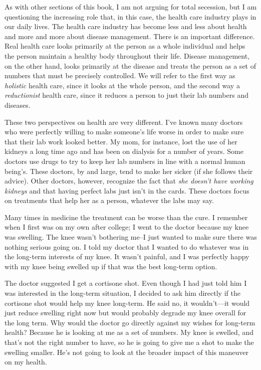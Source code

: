 As with other sections
of this book, I am not arguing for total
secession, but 
I am questioning the
increasing role that,
in this case, the health care industry plays in our daily lives. The
health care industry has become less and less about health and more and
more about disease management. There is an important difference. Real
health care looks primarily at the person as a whole individual and
helps the person maintain a healthy body throughout their life. Disease
management, on the other hand, looks primarily at the disease and
treats the person as a set of numbers that must be precisely
controlled. We will refer to the first way as \textit{holistic} health
care, since it looks at the whole person, and the second way a
\textit{reductionist} health care, since it reduces a person to just
their lab numbers and diseases.

These two perspectives on health are very different.
I've known many doctors who were perfectly willing to
make someone's life worse in order to make sure that
their lab work looked better. My mom, for instance, lost the use of her
kidneys a long time ago and has been on dialysis for a number of years.
Some doctors use drugs to try to keep her lab numbers in line with a
normal human being’s. These doctors, by and large, tend to make her
sicker (if she follows their advice). Other doctors, however, recognize
the fact that \textit{she doesn't have working
kidneys} and that having perfect labs just isn't in
the cards.  These doctors focus on treatments that help her as a
person, whatever the labs may say.

Many times in medicine the treatment can be worse than the cure. I
remember when I first was on my own after college; I went to the doctor
because my knee was swelling. The knee wasn't
bothering me–I just wanted to make sure there was nothing serious
going on. I told my
doctor that I wanted to do whatever was in the long-term interests of
my knee. It wasn't painful, and I was perfectly happy
with my knee being swelled up if that was the best long-term option. 

The doctor suggested I get a cortisone shot. Even though I had just told
him I was interested in the long-term situation, I decided to ask him
directly if the cortisone shot would help my knee long-term. He said
no, it wouldn't—it would just reduce swelling right
now but would probably degrade my knee overall for the long term. Why
would the doctor go directly against my wishes for long-term health? 
Because he is looking at me as a set of numbers. My knee is swelled,
and that's not the right number to have, so he is
going to give me a shot to make the swelling smaller.
He's not going to look at the broader impact of this
maneuver on my health.

